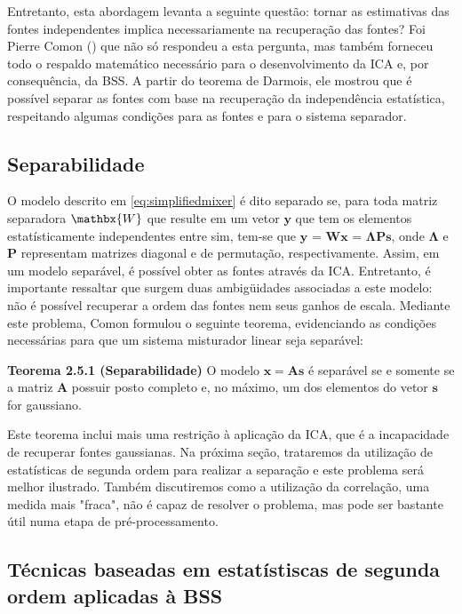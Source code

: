     Entretanto, esta abordagem levanta a seguinte questão: tornar as estimativas das fontes independentes implica necessariamente na recuperação das fontes? Foi Pierre Comon (\cite{Comon}) que não só respondeu a esta pergunta, mas também forneceu todo o respaldo matemático necessário para o desenvolvimento da ICA e, por consequência, da BSS.
    A partir do teorema de Darmois, ele mostrou que é possível separar as fontes com base na recuperação da independência estatística, respeitando algumas condições para as fontes e para o sistema separador.

\subsection{Separabilidade}\label{sec:separability}

    O modelo descrito em \ref{eq:simplifiedmixer} é dito separado se, para toda matriz separadora $\mathbx{W}$ que resulte em um vetor $\mathbf{y}$ que tem os elementos estatísticamente independentes entre sim, tem-se que $\mathbf{y}$ = $\mathbf{Wx}$ = $\mathbf{\Lambda P s}$, onde $\mathbf{\Lambda}$ e $\mathbf{P}$ representam matrizes diagonal e de permutação, respectivamente. Assim, em um modelo separável, é possível obter as fontes através da ICA. Entretanto, é importante ressaltar que surgem duas ambigüidades associadas a este modelo: não é possível recuperar a ordem das fontes nem seus ganhos de escala. Mediante este problema, Comon \nocite{Common} formulou o seguinte teorema, evidenciando as condições necessárias para que um sistema misturador linear seja separável:
    
    \bigskip
    
    \textbf{Teorema 2.5.1 (Separabilidade)} O modelo $\mathbf{x} = \mathbf{As}$ é separável se e somente se a matriz $\mathbf{A}$ possuir posto completo e, no máximo, um dos elementos do vetor $\mathbf{s}$ for gaussiano.
    
    \bigskip
    
    Este teorema inclui mais uma restrição à aplicação da ICA, que é a incapacidade de recuperar fontes gaussianas. Na próxima seção, trataremos da utilização de estatísticas de segunda ordem para realizar a separação e este problema será melhor ilustrado. Também discutiremos como a utilização da correlação, uma medida mais "fraca", não é capaz de resolver o problema, mas pode ser bastante útil numa etapa de pré-processamento.
  
\subsection{Técnicas baseadas em estatístiscas de segunda ordem aplicadas à BSS}\label{secondorder}

